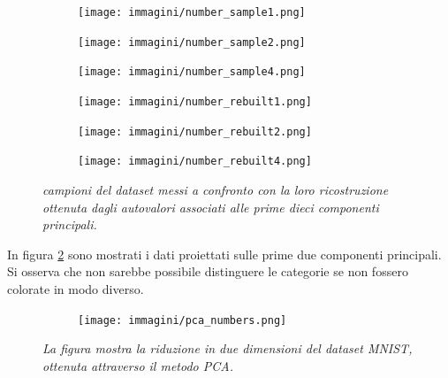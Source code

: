 \documentclass{article}
\begin{document}
\begin{figure}[H]
    \centering
    \begin{subfigure}[b]{0.29\textwidth}
        \centering
        \texttt{[image: immagini/number\_sample1.png]}
    \end{subfigure}
    \begin{subfigure}[b]{0.29\textwidth}
        \centering
        \texttt{[image: immagini/number\_sample2.png]}
    \end{subfigure}
    \begin{subfigure}[b]{0.29\textwidth}
        \centering
        \texttt{[image: immagini/number\_sample4.png]}
    \end{subfigure}
    \begin{subfigure}[b]{0.29\textwidth}
        \centering
        \texttt{[image: immagini/number\_rebuilt1.png]}
    \end{subfigure}
    \begin{subfigure}[b]{0.29\textwidth}
        \centering
        \texttt{[image: immagini/number\_rebuilt2.png]}
    \end{subfigure}
    \begin{subfigure}[b]{0.29\textwidth}
        \centering
        \texttt{[image: immagini/number\_rebuilt4.png]}
    \end{subfigure}
    \caption{\emph{campioni del dataset messi a confronto con la loro ricostruzione ottenuta dagli autovalori associati alle prime dieci componenti principali.}}
    \label{fig:confronto_numeri}
\end{figure}

In figura \ref{fig:pca_numbers} sono mostrati i dati proiettati sulle prime due componenti principali.
Si osserva che non sarebbe possibile distinguere le categorie se non fossero colorate in modo diverso.

\begin{figure}[H]
    \centering
    \begin{subfigure}[b]{0.8\textwidth}
        \centering
        \texttt{[image: immagini/pca\_numbers.png]}
    \end{subfigure}
    \caption{\emph{La figura mostra la riduzione in due dimensioni del dataset MNIST, ottenuta attraverso il metodo PCA.}}
    \label{fig:pca_numbers}
\end{figure}
\end{document}
